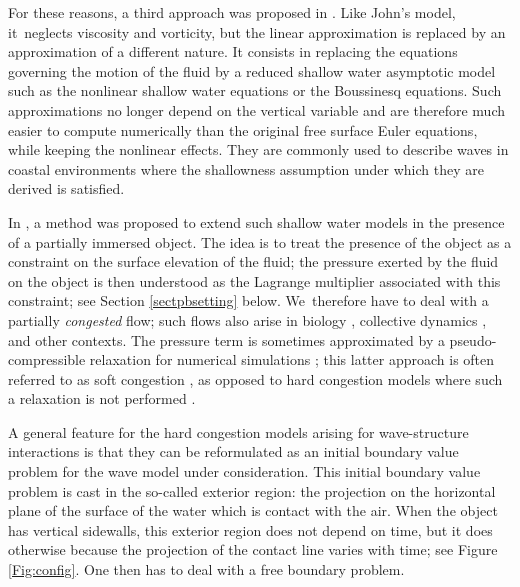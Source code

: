 For these reasons, a third approach was proposed in \cite{Lannes2017}.
Like John's model, it~\hbox{neglects} viscosity and vorticity, but the linear approximation is replaced by an approximation of a different nature.
It consists in replacing the equations governing the motion of the fluid by a reduced shallow water asymptotic model
such as the nonlinear shallow water equations or the Boussinesq equations.
Such approximations no longer depend on the vertical variable and are therefore much easier to compute numerically than the original free surface Euler equations,
while keeping the nonlinear effects.
They are commonly used to describe waves in coastal environments where the shallowness assumption under which they are derived is satisfied.

In \cite{Lannes2017}, a method was proposed to extend such shallow water models in the presence of a partially immersed object.
The idea is to treat the presence of the object as a constraint on the surface elevation of the fluid;
the pressure exerted by the fluid on the object is then understood as the Lagrange multiplier associated with this constraint;
see Section \ref{sectpbsetting} below. We~therefore have to deal with a partially {\it congested} flow;
such flows also arise in biology \cite{PQV}, collective dynamics \cite{DHN,MRSV}, and other contexts.
The pressure term is sometimes approximated by a pseudo-compressible relaxation for numerical simulations \cite{GPSW1,GPSW2};
this latter approach is often referred to as soft congestion \cite{Perrin},
as opposed to hard congestion models where such a relaxation is not performed \cite{ABP,DalibardPerrin1,DalibardPerrin2}.

A general feature for the hard congestion models arising for wave-structure interactions is that
they can be reformulated as an initial boundary value problem for the wave model under consideration.
This initial boundary value problem is cast in the so-called exterior region:
the projection on the horizontal plane of the surface of the water which is contact with the air.
When the object has vertical sidewalls, this exterior region does not depend on time,
but it does otherwise because the projection of the contact line varies with time; see Figure \ref{Fig:config}.
One then has to deal with a free boundary problem.


